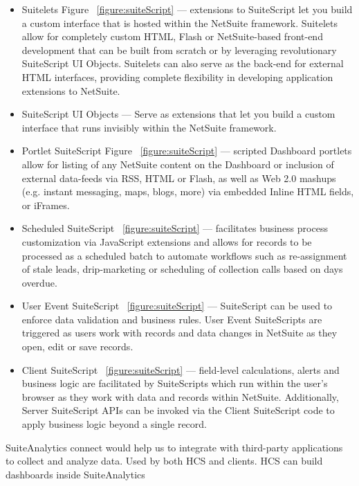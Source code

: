 \begin{itemize}
    \item Suitelets Figure ~\ref{figure:suiteScript} — extensions to SuiteScript let you build a custom interface that is hosted within the NetSuite framework. Suitelets allow for completely custom HTML, Flash or NetSuite-based front-end development that can be built from scratch or by leveraging revolutionary SuiteScript UI Objects. Suitelets can also serve as the back-end for external HTML interfaces, providing complete flexibility in developing application extensions to NetSuite.
    \item SuiteScript UI Objects — Serve as extensions that let you build a custom interface that runs invisibly within the NetSuite framework.
    \item Portlet SuiteScript Figure ~\ref{figure:suiteScript} — scripted Dashboard portlets allow for listing of any NetSuite content on the Dashboard or inclusion of external data-feeds via RSS, HTML or Flash, as well as Web 2.0 mashups (e.g. instant messaging, maps, blogs, more) via embedded Inline HTML fields, or iFrames.
    \item Scheduled SuiteScript ~\ref{figure:suiteScript} — facilitates business process customization via JavaScript extensions and allows for records to be processed as a scheduled batch to automate workflows such as re-assignment of stale leads, drip-marketing or scheduling of collection calls based on days overdue.
    \item User Event SuiteScript ~\ref{figure:suiteScript} — SuiteScript can be used to enforce data validation and business rules. User Event SuiteScripts are triggered as users work with records and data changes in NetSuite as they open, edit or save records.
    \item Client SuiteScript ~\ref{figure:suiteScript} — field-level calculations, alerts and business logic are facilitated by SuiteScripts which run within the user's browser as they work with data and records within NetSuite. Additionally, Server SuiteScript APIs can be invoked via the Client SuiteScript code to apply business logic beyond a single record.
\end{itemize}


SuiteAnalytics connect would help us to integrate with third-party applications to collect and analyze data. Used by both HCS and clients. HCS can build dashboards inside SuiteAnalytics


